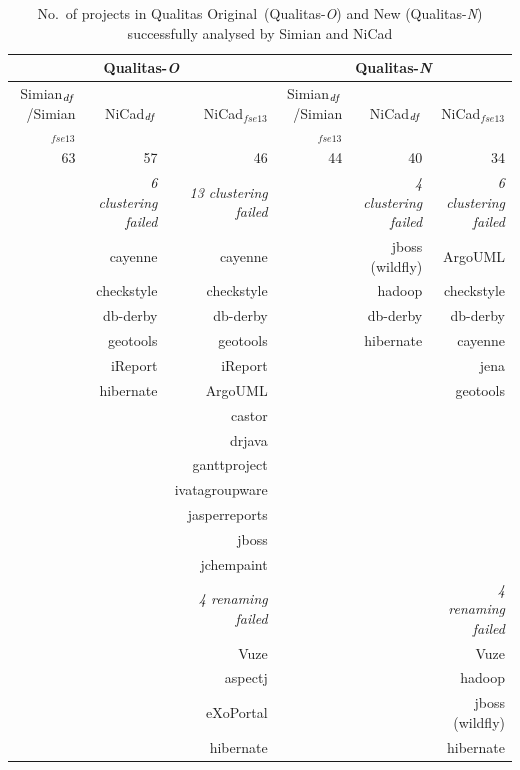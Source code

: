 \documentclass{IEEEtran}
\begin{document}
\begin{table}[H]
	\centering
	\caption{No.~of projects in Qualitas Original~(Qualitas-\textit{O}) and New (Qualitas-\textit{N}) successfully analysed by Simian and NiCad}
	\label{tab:projects_missing}
	\begin{tabular}{r|r|r|r|r|r}
		\hline
		\multicolumn{3}{c|}{Qualitas-\textit{O}} & \multicolumn{3}{c}{Qualitas-\textit{N}} \\
		\hline
		Simian$_{\textrm{\textit{df}}}$/Simian$_{fse13}$ & NiCad$_{\textrm{\textit{df}}}$ & NiCad$_{fse13}$ & Simian$_{\textrm{\textit{df}}}$/Simian$_{fse13}$ & NiCad$_{\textrm{\textit{df}}}$ & NiCad$_{fse13}$ \\ \hline
		63	& 57 & 46 & 44 & 40 & 34 \\
		\hline
		& \textit{6 clustering failed} & \textit{13 clustering failed} & & \textit{4 clustering failed} & \textit{6 clustering failed} \\
		& cayenne   & cayenne 	& & jboss (wildfly) & ArgoUML \\
		& checkstyle & checkstyle & & hadoop & checkstyle \\
		& db-derby 	& db-derby 	& & db-derby & db-derby \\
		& geotools 	& geotools  & & hibernate & cayenne \\
		& iReport 	& iReport   & & & jena \\
		& hibernate & ArgoUML 	& & & geotools \\
		&			& castor 		& & & \\
		&			& drjava 		& & & \\
		&			& ganttproject 	& & & \\
		&			& ivatagroupware & & &  \\
		&			& jasperreports & & & \\
		&			& jboss 		& & & \\
		&			& jchempaint 	& & & \\
		\hline
		& 			&  \textit{4 renaming failed} & & & \textit{4 renaming failed} \\
		&			& Vuze 		& & & Vuze \\
		&			& aspectj 	& & & hadoop \\
		&			& eXoPortal 	& & & jboss (wildfly) \\
		&			&  hibernate 	& & & hibernate \\
		\hline
	\end{tabular}
\end{table}
\end{document}
